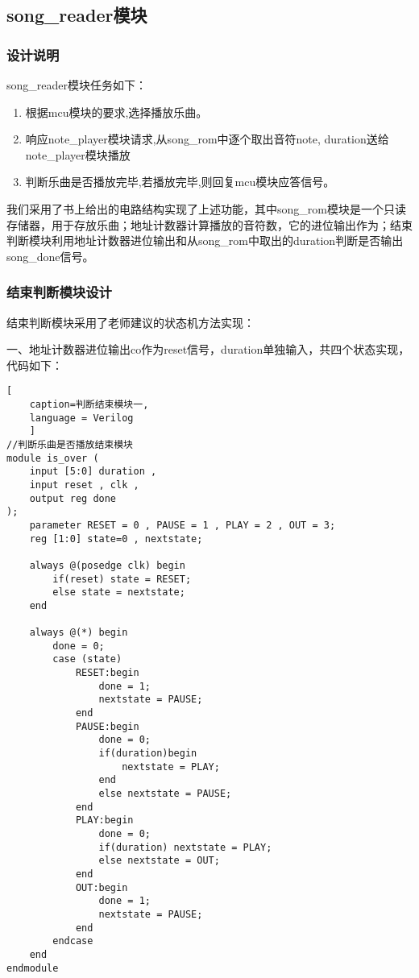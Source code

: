 \documentclass{../source/zjureport}
\begin{document}
        \subsection{song_reader模块}
            \subsubsection{设计说明}
            song_reader模块任务如下：
            \begin{enumerate}
                \item 根据mcu模块的要求,选择播放乐曲。
                \item 响应note_player模块请求,从song_rom中逐个取出音符{note, duration}送给note_player模块播放
                \item 判断乐曲是否播放完毕,若播放完毕,则回复mcu模块应答信号。
            \end{enumerate}


            我们采用了书上给出的电路结构实现了上述功能，其中song_rom模块是一个只读存储器，用于存放乐曲；地址计数器计算播放的音符数，它的进位输出作为；结束判断模块利用地址计数器进位输出和从song_rom中取出的duration判断是否输出song_done信号。

            \subsubsection{结束判断模块设计}
            结束判断模块采用了老师建议的状态机方法实现：


            一、地址计数器进位输出co作为reset信号，duration单独输入，共四个状态实现，代码如下：
\begin{lstlisting}[
    caption=判断结束模块一,
    language = Verilog
    ]
//判断乐曲是否播放结束模块
module is_over (
    input [5:0] duration ,
    input reset , clk ,
    output reg done
);
    parameter RESET = 0 , PAUSE = 1 , PLAY = 2 , OUT = 3;
    reg [1:0] state=0 , nextstate;

    always @(posedge clk) begin
        if(reset) state = RESET;
        else state = nextstate;
    end

    always @(*) begin
        done = 0;
        case (state)
            RESET:begin
                done = 1;
                nextstate = PAUSE;
            end 
            PAUSE:begin
                done = 0;
                if(duration)begin
                    nextstate = PLAY;
                end
                else nextstate = PAUSE;
            end
            PLAY:begin
                done = 0;
                if(duration) nextstate = PLAY;
                else nextstate = OUT;
            end
            OUT:begin
                done = 1;
                nextstate = PAUSE;
            end
        endcase
    end
endmodule
\end{lstlisting}
\end{document}
